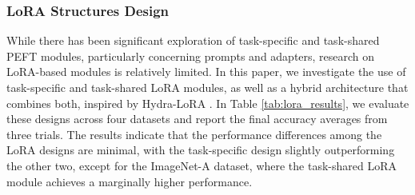 \subsubsection{LoRA Structures Design}
While there has been significant exploration of task-specific and task-shared PEFT modules, particularly concerning prompts and adapters, research on LoRA-based modules is relatively limited. In this paper, we investigate the use of task-specific and task-shared LoRA modules, as well as a hybrid architecture that combines both, inspired by Hydra-LoRA \cite{tian2024hydralora}. In Table \ref{tab:lora_results}, we evaluate these designs across four datasets and report the final accuracy averages from three trials. The results indicate that the performance differences among the LoRA designs are minimal, with the task-specific design slightly outperforming the other two, except for the ImageNet-A dataset, where the task-shared LoRA module achieves a marginally higher performance.
